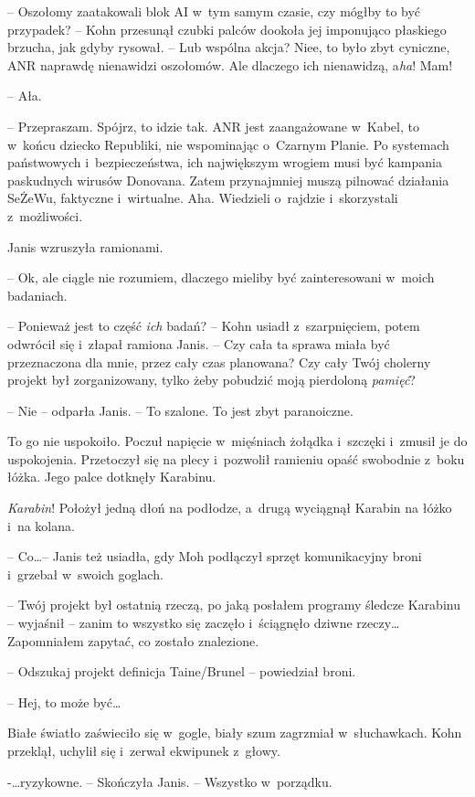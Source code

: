 \documentclass[oneside,polish,11pt,sfheadings]{mwbk}
\begin{document}
-- Oszołomy zaatakowali blok AI w~tym samym czasie, czy mógłby to być
przypadek? -- Kohn przesunął czubki palców dookoła jej imponująco
płaskiego brzucha, jak gdyby rysował. -- Lub wspólna akcja? Niee, to było
zbyt cyniczne, ANR naprawdę nienawidzi oszołomów. Ale dlaczego ich
nienawidzą, a\emph{ha}! Mam!

-- Ała.

-- Przepraszam. Spójrz, to idzie tak. ANR jest zaangażowane w~Kabel, to w~końcu dziecko Republiki, nie wspominając o~Czarnym Planie. Po systemach
państwowych i~bezpieczeństwa, ich największym wrogiem musi być kampania
paskudnych wirusów Donovana. Zatem przynajmniej muszą pilnować działania
SeŻeWu, faktyczne i~wirtualne. Aha. Wiedzieli o~rajdzie i~skorzystali z~możliwości.

Janis wzruszyła ramionami. 

-- Ok, ale ciągle nie rozumiem, dlaczego
mieliby być zainteresowani w~moich badaniach.

-- Ponieważ jest to część \emph{ich }badań? -- Kohn usiadł z~szarpnięciem,
potem odwrócił się i~złapał ramiona Janis. -- Czy cała ta sprawa miała
być przeznaczona dla mnie, przez cały czas planowana? Czy cały Twój
cholerny projekt był zorganizowany, tylko żeby pobudzić moją pierdoloną
\emph{pamięć}?

-- Nie -- odparła Janis. -- To szalone. To jest zbyt paranoiczne.

To go nie uspokoiło. Poczuł napięcie w~mięśniach żołądka i~szczęki i~zmusił je do uspokojenia. Przetoczył się na plecy i~pozwolił ramieniu
opaść swobodnie z~boku łóżka. Jego palce dotknęły Karabinu.

\emph{Karabin}! Położył jedną dłoń na podłodze, a~drugą wyciągnął
Karabin na łóżko i~na kolana.

-- Co\ldots -- Janis też usiadła, gdy Moh podłączył sprzęt komunikacyjny
broni i~grzebał w~swoich goglach.

-- Twój projekt był ostatnią rzeczą, po jaką posłałem programy śledcze
Karabinu -- wyjaśnił -- zanim to wszystko się zaczęło i~ściągnęło dziwne
rzeczy\ldots Zapomniałem zapytać, co zostało znalezione.

-- Odszukaj projekt definicja Taine/Brunel -- powiedział broni.

-- Hej, to może być\ldots

Białe światło zaświeciło się w~gogle, biały szum zagrzmiał w~słuchawkach. Kohn przeklął, uchylił się i~zerwał ekwipunek z~głowy.

-\ldots ryzykowne. -- Skończyła Janis. -- Wszystko w~porządku.
\end{document}

